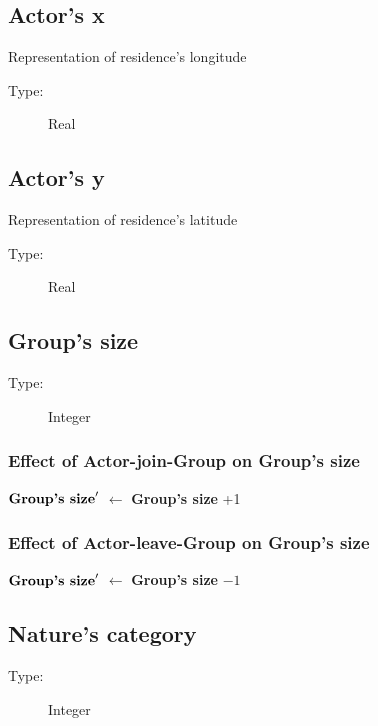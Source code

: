 \documentclass{article}%
\begin{document}
%
\subsection{Actor's x}%
\label{subsec:Actor's x}%
Representation of residence's longitude%
\begin{description}%
\item[Type:]%
Real%
\end{description}

%
\subsection{Actor's y}%
\label{subsec:Actor's y}%
Representation of residence's latitude%
\begin{description}%
\item[Type:]%
Real%
\end{description}

%
\subsection{Group's size}%
\label{subsec:Group's size}%
\begin{description}%
\item[Type:]%
Integer%
\end{description}%
\subsubsection{Effect of Actor{-}join{-}Group on Group's size}%
\label{ssubsec:Effect of Actor{-}join{-}Group on Group's size}%
\begin{flushleft}%
$\mbox{\textbf{Group's size}} '$%
$\leftarrow$%
\textbf{Group's size}%
+1%
\end{flushleft}

%
\subsubsection{Effect of Actor{-}leave{-}Group on Group's size}%
\label{ssubsec:Effect of Actor{-}leave{-}Group on Group's size}%
\begin{flushleft}%
$\mbox{\textbf{Group's size}} '$%
$\leftarrow$%
\textbf{Group's size}%
${-}1$%
\end{flushleft}

%
\subsection{Nature's category}%
\label{subsec:Nature's category}%
\begin{description}%
\item[Type:]%
Integer%
\end{description}%
\end{document}
